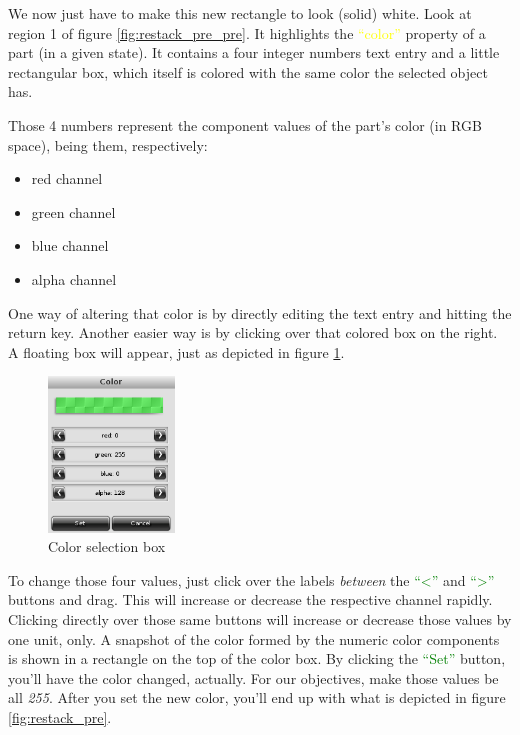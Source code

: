 \documentclass[a4paper]{profusion}
\newcommand{\GUIButton}[1]{\textcolor{green}{#1}} %
\newcommand{\GUIEditable}[1]{\textcolor{yellow}{#1}} %
\begin{document}
We now just have to make this new rectangle to look (solid) white.
Look at region 1 of figure \ref{fig:restack_pre_pre}. It highlights
the \GUIEditable{``color''} property of a part (in a given state). It
contains a four integer numbers text entry and a little rectangular
box, which itself is colored with the same color the selected object
has.

Those 4 numbers represent the component values of the part's color (in
RGB space), being them, respectively:

\begin{itemize}
\item red channel
\item green channel
\item blue channel
\item alpha channel
\end{itemize}

One way of altering that color is by directly editing the text entry
and hitting the return key. Another easier way is by clicking over
that colored box on the right. A floating box will appear, just as
depicted in figure \ref{fig:color_box}.

\begin{figure}[h!]
  \centering
  \includegraphics[width=0.3\textwidth]{images/color_box.png}
  \caption{Color selection box}
  \label{fig:color_box}
\end{figure}

To change those four values, just click over the labels \emph{between}
the \GUIButton{``<''} and \GUIButton{``>''} buttons and drag. This
will increase or decrease the respective channel rapidly. Clicking
directly over those same buttons will increase or decrease those
values by one unit, only. A snapshot of the color formed by the
numeric color components is shown in a rectangle on the top of the
color box. By clicking the \GUIButton{``Set''} button, you'll have the
color changed, actually. For our objectives, make those values be
all \emph{255}. After you set the new color, you'll end up with what
is depicted in figure \ref{fig:restack_pre}.
\end{document}
